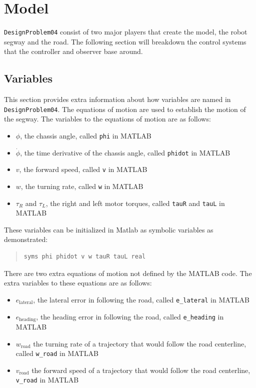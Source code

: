 \documentclass[12pt]{article}
\begin{document}
\section{Model}
\lstinline!DesignProblem04! consist of two major players that create the model, the robot segway and the road. The following section will breakdown the control systems that the controller and observer base around.


\subsection{Variables}
This section provides extra information about how variables are named in \lstinline|DesignProblem04|. The equations of motion are used to establish the motion of the segway. The variables to the equations of motion are as follows: \cite{bretl}
\begin{itemize}
\item $\phi$, the chassis angle, called \lstinline|phi| in MATLAB
\item $\dot{\phi}$, the time derivative of the chassis angle, called \lstinline|phidot| in MATLAB
\item $v$, the forward speed, called \lstinline|v| in MATLAB
\item $w$, the turning rate, called \lstinline|w| in MATLAB
\item $\tau_{R}$ and $\tau_{L}$, the right and left motor torques, called \lstinline|tauR| and \lstinline|tauL| in MATLAB
\end{itemize}
These variables can be initialized in Matlab as symbolic variables as demonstrated:
\begin{quote}
\begin{lstlisting}
syms phi phidot v w tauR tauL real
\end{lstlisting}
\end{quote}
There are two extra equations of motion not defined by the MATLAB code. The extra variables to these equations are as follows:
\begin{itemize}
\item $e_\text{lateral}$, the lateral error in following the road, called \lstinline|e_lateral| in MATLAB
\item $e_\text{heading}$, the heading error in following the road, called \lstinline|e_heading| in MATLAB
\item $w_\text{road}$ the turning rate of a trajectory that would follow the road centerline, called \lstinline|w_road| in MATLAB
\item $v_\text{road}$ the forward speed of a trajectory that would follow the road centerline,  \lstinline|v_road| in MATLAB
\end{itemize}
\end{document}
